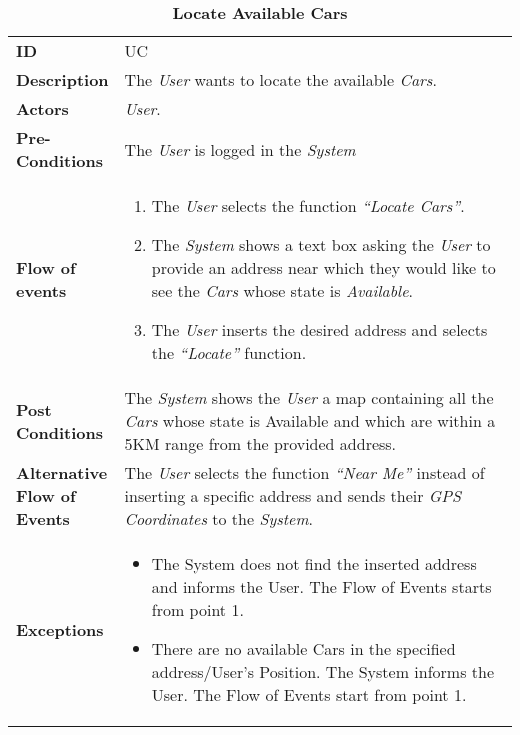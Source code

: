 \begin{longtable}{|p{0.2\linewidth} p{0.8\linewidth}|}
	\captionsetup{labelformat=empty} %
	\caption{\textbf{Locate Available Cars}} %
	\label{UC_LocateCars}%
	\\ \hline %
	
	\textbf{ID} & UC\theUseCaseIdCounter \\ \hline
	\textbf{Description} & The \emph{User} wants to locate the available \emph{Cars}. \\ \hline
	\textbf{Actors} & \emph{User}.\\ \hline
	\textbf{Pre-Conditions} & The \emph{User} is logged in the \emph{System} \\ \hline
	\textbf{Flow of events} & 
	\begin{enumerate}
		\item The \emph{User} selects the function \textit{\textquotedblleft{Locate Cars}\textquotedblright}.
		\item The \emph{System} shows a text box asking the \emph{User} to provide an address near which they would like to see the \emph{Cars} whose state is \textit{Available}.
		\item The \emph{User} inserts the desired address and selects the \textit{\textquotedblleft{Locate}\textquotedblright} function.
	\end{enumerate}	 \\ \hline
	\textbf{Post Conditions} & The \emph{System} shows the \emph{User} a map containing all the \emph{Cars} whose state is Available and which are within a 5KM range from the provided address. \\ \hline
	\textbf{Alternative Flow of Events} & The \emph{User} selects the function \textit{\textquotedblleft{Near Me}\textquotedblright} instead of inserting a specific address and sends their \emph{GPS Coordinates} to the \emph{System}. \\ \hline
	\textbf{Exceptions} & 
	\begin{itemize}
		\item The System does not find the inserted address and informs the User. The Flow of Events starts from point 1.
		\item There are no available Cars in the specified address/User's Position. The System informs the User. The Flow of Events start from point 1.
	\end{itemize} \\ \hline
\end{longtable}

